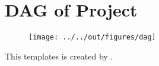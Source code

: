 \documentclass[11pt, a4paper, leqno]{article}
\begin{document}




\printbibliography
{}

\newpage
\appendix
\section{DAG of Project}\label{app A}
\begin{figure}[H]
\texttt{[image: ../../out/figures/dag]}
\end{figure}

This templates is created by \citet{GaudeckerEconProjectTemplates}.



\end{document}
